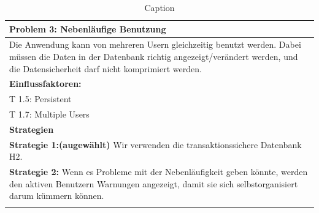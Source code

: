 \documentclass[enabledeprecatedfontcommands,fontsize=12pt,paper=a4,twoside]{scrartcl}
\begin{document}
\begin{table}[H]
    \centering
    \begin{tabular}{|p{15cm}|}
    \hline
          \textbf{Problem 3:} Nebenläufige Benutzung  \\ \hline
          Die Anwendung kann von mehreren Usern gleichzeitig benutzt werden. Dabei müssen die Daten in der Datenbank richtig angezeigt/verändert werden, und die Datensicherheit darf nicht komprimiert werden. \\ \hline
          \textbf{Einflussfaktoren: } \\
          T 1.5: Persistent \\
          T 1.7: Multiple Users\\
          \hline
          \textbf{Strategien} \\ \hline
          \textbf{Strategie 1:(augewählt)} Wir verwenden die transaktionssichere Datenbank H2. \\
          \textbf{Strategie 2:} Wenn es Probleme mit der Nebenläufigkeit geben könnte, werden den aktiven Benutzern Warnungen angezeigt, damit sie sich selbstorganisiert darum kümmern können. \\
          \\ \hline
    \end{tabular}

    \caption{Caption}
    \label{tab:my_label}
\end{table}
\end{document}
